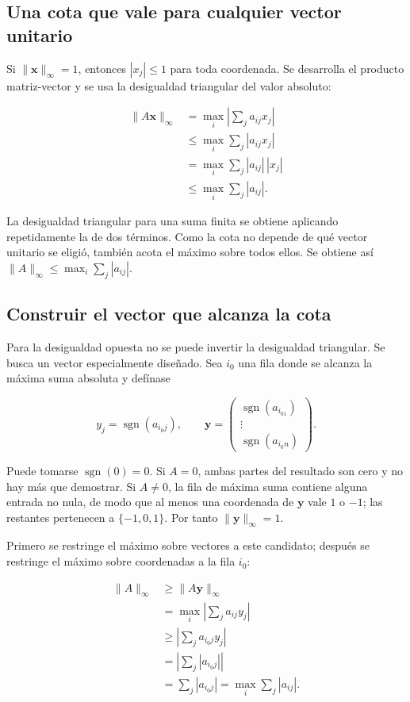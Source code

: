 \documentclass[12pt,a4paper]{article}
\begin{document}
\subsection{Una cota que vale para cualquier vector unitario}

Si $\|\mathbf x\|_\infty=1$, entonces $|x_j|\le1$ para toda coordenada. Se desarrolla el producto matriz-vector y se usa la desigualdad triangular del valor absoluto:

\[
\begin{aligned}
\|A\mathbf x\|_\infty
&=\max_i\left|\sum_j a_{ij}x_j\right|\\
&\le\max_i\sum_j|a_{ij}x_j|\\
&=\max_i\sum_j|a_{ij}|\,|x_j|\\
&\le\max_i\sum_j|a_{ij}|.
\end{aligned}
\]

La desigualdad triangular para una suma finita se obtiene aplicando repetidamente la de dos términos. Como la cota no depende de qué vector unitario se eligió, también acota el máximo sobre todos ellos. Se obtiene así $\|A\|_\infty\le\max_i\sum_j|a_{ij}|$.

\subsection{Construir el vector que alcanza la cota}

Para la desigualdad opuesta no se puede invertir la desigualdad triangular. Se busca un vector especialmente diseñado. Sea $i_0$ una fila donde se alcanza la máxima suma absoluta y defínase

\[
y_j=\operatorname{sgn}(a_{i_0j}),\qquad
\mathbf y=\begin{pmatrix}
\operatorname{sgn}(a_{i_01})\\\vdots\\\operatorname{sgn}(a_{i_0n})
\end{pmatrix}.
\]

Puede tomarse $\operatorname{sgn}(0)=0$. Si $A=0$, ambas partes del resultado son cero y no hay más que demostrar. Si $A\ne0$, la fila de máxima suma contiene alguna entrada no nula, de modo que al menos una coordenada de $\mathbf y$ vale $1$ o $-1$; las restantes pertenecen a $\{-1,0,1\}$. Por tanto $\|\mathbf y\|_\infty=1$.

Primero se restringe el máximo sobre vectores a este candidato; después se restringe el máximo sobre coordenadas a la fila $i_0$:

\[
\begin{aligned}
\|A\|_\infty
&\ge\|A\mathbf y\|_\infty\\
&=\max_i\left|\sum_j a_{ij}y_j\right|\\
&\ge\left|\sum_j a_{i_0j}y_j\right|\\
&=\left|\sum_j |a_{i_0j}|\right|\\
&=\sum_j |a_{i_0j}|=\max_i\sum_j|a_{ij}|.
\end{aligned}
\]
\end{document}
